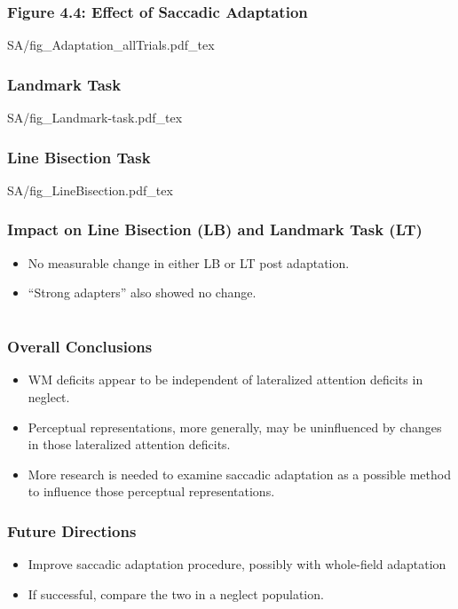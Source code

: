 \documentclass{beamer}
\begin{document}
\begin{frame}
	\frametitle{Figure 4.4: Effect of Saccadic Adaptation}
	\centering
	\def\svgwidth{0.9\textwidth}
	\tiny
	{SA/fig_Adaptation_allTrials.pdf_tex}
\end{frame}

\begin{frame}
	\frametitle{Landmark Task}
	\def\svgwidth{0.8\textwidth}
	{SA/fig_Landmark-task.pdf_tex}
\end{frame}

\begin{frame}
	\frametitle{Line Bisection Task}
	\def\svgwidth{0.9\textwidth}
	{SA/fig_LineBisection.pdf_tex}
\end{frame}

\begin{frame}
	\frametitle{Impact on Line Bisection (LB) and Landmark Task (LT)}
	\begin{itemize}
		\item No measurable change in either LB or LT post adaptation.
		\item ``Strong adapters'' also showed no change.
	\end{itemize}

\end{frame}


\section*{}
\begin{frame}
	\frametitle{Overall Conclusions}
	\begin{itemize}
		\item WM deficits appear to be independent of lateralized attention deficits in neglect.
		\item Perceptual representations, more generally, may be uninfluenced by changes in those lateralized attention deficits.
		\item More research is needed to examine saccadic adaptation as a possible method to influence those perceptual representations.
	\end{itemize}
\end{frame}

\begin{frame}
	\frametitle{Future Directions}
	\begin{itemize}
		\item Improve saccadic adaptation procedure, possibly with whole-field adaptation
		\item If successful, compare the two in a neglect population.
	\end{itemize}
\end{frame}
\end{document}
